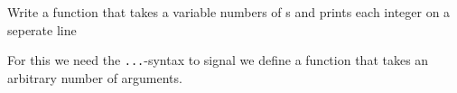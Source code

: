 \begin{Exercise}[title={Var args},difficulty=5]
\label{ex:varargs}
\Question\label{ex:varargs q1}
Write a function that takes a variable numbers of s and prints
each integer on a seperate line
\end{Exercise}

\begin{Answer}
\Question
For this we need the \lstinline{...}-syntax to signal we define a
function that takes an arbitrary number of arguments.



\end{Answer}
